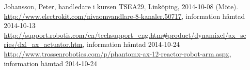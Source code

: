 \begin{thebibliography}{9}
 Johansson, Peter, handledare i kursen TSEA29, Linköping, 2014-10-08 (Möte).
 \url{http://www.electrokit.com/nivaomvandlare-8-kanaler.50717}, information hämtad 2014-10-13
 \url{http://support.robotis.com/en/techsupport_eng.htm#product/dynamixel/ax_series/dxl_ax_actuator.htm}, information hämtad 2014-10-24
 \url{http://www.trossenrobotics.com/p/phantomx-ax-12-reactor-robot-arm.aspx}, information hämtad 2014-10-24
\end{thebibliography}